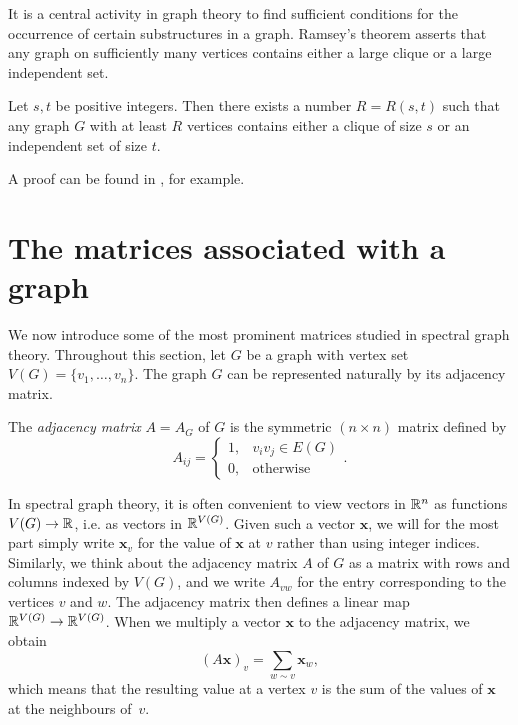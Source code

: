 It is a central activity in graph theory to find sufficient conditions for the occurrence of certain substructures in a graph.
Ramsey's theorem asserts that any graph on sufficiently many vertices contains either a large clique or a large independent set.

\begin{theorem} \label{thm:ramsey}
    Let $s, t$ be positive integers. 
    Then there exists a number $R = R(s, t)$ such that any graph $G$ with at least $R$ vertices contains either a clique of size $s$ or an independent set of size $t$.
\end{theorem}

A proof can be found in \cite[Theorem VI.1]{bollobas}, for example.

\section{The matrices associated with a graph}
    \label{section:matrices}
    
We now introduce some of the most prominent matrices studied in spectral graph theory.
Throughout this section, let $G$ be a graph with vertex set $V(G) = \{v_1, \dots, v_n\}$.
The graph $G$ can be represented naturally by its adjacency matrix.

\begin{definition}
    The \textit{adjacency matrix} $A = A_G$ of $G$ is the symmetric $(n \times n)$ matrix defined by
    \begin{equation*}
        A_{ij} = \left\{\begin{array}{ll}
            1, & v_i v_j \in E(G) \\
            0, & \text{otherwise}
        \end{array} \right. .
    \end{equation*}
\end{definition}

\begin{remark}
    In spectral graph theory, it is often convenient to view vectors in $\mathbb{R}^n$ as functions $V(G) \rightarrow \mathbb{R}$, i.e. as vectors in $\mathbb{R}^{V(G)}$.
    Given such a vector $\bm{x}$, we will for the most part simply write $\bm{x}_v$ for the value of $\bm{x}$ at $v$ rather than using integer indices. 
    Similarly, we think about the adjacency matrix $A$ of $G$ as a matrix with rows and columns indexed by $V(G)$, and we write $A_{vw}$ for the entry corresponding to the vertices $v$ and $w$.
    The adjacency matrix then defines a linear map $\mathbb{R}^{V(G)} \rightarrow \mathbb{R}^{V(G)}$.
    When we multiply a vector $\bm{x}$ to the adjacency matrix, we obtain
    \begin{equation*}
        (A \bm{x})_v = \sum \limits_{w \sim v} \bm{x}_w,
    \end{equation*}
    which means that the resulting value at a vertex $v$ is the sum of the values of $\bm{x}$ at the neighbours \mbox{of $v$}.
\end{remark}

